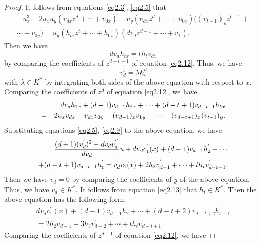\documentclass[12pt, twoside, leqno]{article}
\theoremstyle{definition}
\numberwithin{equation}{section}
\begin{document}
\begin{proof}
It follows from equations \eqref{eq2.3}, \eqref{eq2.5} that
\begin{equation}\label{eq2.12}
\begin{split}
-u_{x}^{3}-2u_{x}u_{y}(v_{dx}z^{d}+\cdots+v_{0x})-u_{y}(v_{dx}z^{d}+\cdots+v_{0x})( (v_{t-1})_yz^{t-1}+\\\cdots+v_{0y})
	=u_{y}(h_{tx}z^{t}+\cdots+h_{0x})(dv_{d}z^{d-1}+\cdots+v_{1}).
\end{split}
\end{equation}
Then we have
$$dv_dh_{tx}=th_tv_{dx}$$
by comparing the coefficients of $z^{d+t-1}$ of equation \eqref{eq2.12}. Thus, we have
\begin{equation}\label{eq2.13}
v_d^t=\lambda h_t^d
\end{equation}
with $\lambda\in K^*$ by integrating both sides of the above equation with respect to $x$.
Comparing the coefficients of $z^d$ of equation \eqref{eq2.12}, we have
\begin{equation}
\begin{split}
dv_{d}h_{1x}+(d-1)v_{d-1}h_{2x}+\cdots+(d-t+1)v_{d-t+1}h_{tx}\notag\\=-2u_{x}v_{dx}-v_{dx}v_{0y}-(v_{d-1})_xv_{1y}-\cdots-(v_{d-t+1})_x(v_{t-1})_y.
\end{split}
\end{equation}
Substituting equations \eqref{eq2.5}, \eqref{eq2.9} to the above equation, we have
\begin{equation}
\begin{split}
\frac{(d+1)(v_{d}^{'})^{2}-dv_{d}v_{d}^{''}}{dv_{d}}u+dv_{d}c_{1}^{'}(x)+(d-1)v_{d-1}h_{2}^{'}+\cdots\\+(d-t+1)v_{d-t+1}h_{t}^{'}\notag=v_{d}^{'}c_{1}(x)+2h_{2}v_{d-1}^{'}+\cdots+th_{t}v_{d-t+1}^{'}.
\end{split}
\end{equation}
Then we have $v_{d}^{'}=0$ by comparing the coefficients of $y$ of the above equation. Thus, we have $v_d\in K^*$. It follows from equation \eqref{eq2.13} that $h_t\in K^*$. Then the above equation has the following form:
\begin{equation}\label{eq2.14}
\begin{split}
dv_{d}c_{1}^{'}(x)+(d-1)v_{d-1}h_{2}^{'}+\cdots+(d-t+2)v_{d-t+2}h_{t-1}^{'}\\=2h_{2}v_{d-1}^{'}+3h_3v_{d-2}^{'}+\cdots+th_{t}v_{d-t+1}^{'}.
\end{split}
\end{equation}
Comparing the coefficients of $z^{d-1}$ of equation \eqref{eq2.12}, we have

\end{proof}
\end{document}
